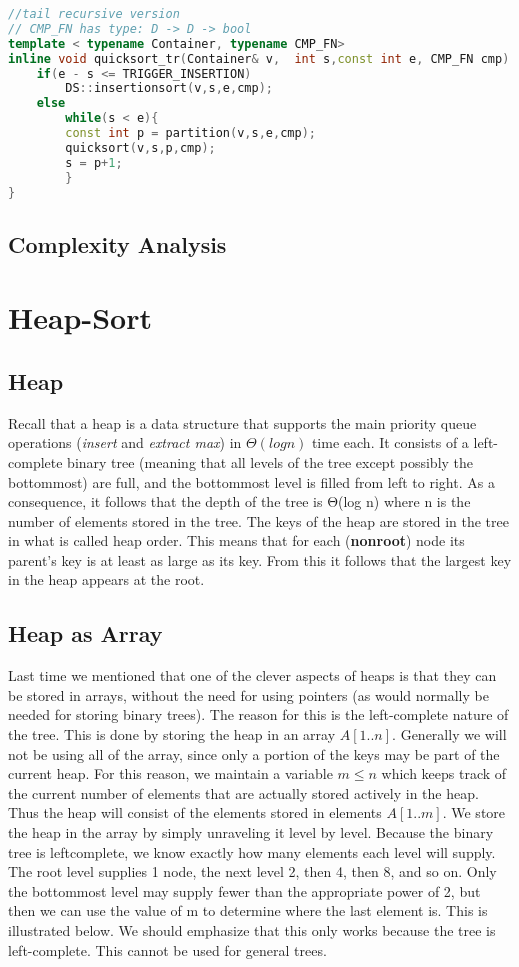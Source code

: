 \begin{lstlisting}[language=c++, caption="QuickSort Tail Recursive"]
//tail recursive version
// CMP_FN has type: D -> D -> bool
template < typename Container, typename CMP_FN>
inline void quicksort_tr(Container& v,  int s,const int e, CMP_FN cmp) {
    if(e - s <= TRIGGER_INSERTION)
        DS::insertionsort(v,s,e,cmp);
    else
        while(s < e){
        const int p = partition(v,s,e,cmp);
        quicksort(v,s,p,cmp);
        s = p+1;
        }
}
\end{lstlisting}


\subsection{Complexity Analysis}

\section{Heap-Sort}
\subsection{Heap}
Recall that a heap is a data structure that supports the main priority queue operations (\textit{insert} and \textit{extract max}) in $\mathcal{\Theta}(log n)$ time each. It consists of a left-complete binary tree (meaning that all levels of the tree except possibly the bottommost) are full, and the bottommost level is filled from left to right. As a consequence, it follows that the depth of the tree is Θ(log n) where n is the number of elements stored in the tree. The keys of the heap are stored in the tree in what is called heap order. This means that for each (\textbf{nonroot}) node its parent’s key is at least as large as its key. From this it follows that the largest key in the heap appears at the root.
\subsection{Heap as Array}
Last time we mentioned that one of the clever aspects of heaps is that they can be stored in
arrays, without the need for using pointers (as would normally be needed for storing binary trees). The
reason for this is the left-complete nature of the tree.
This is done by storing the heap in an array $A[1..n]$. Generally we will not be using all of the array,
since only a portion of the keys may be part of the current heap. For this reason, we maintain a variable
$m \leq n$ which keeps track of the current number of elements that are actually stored actively in the
heap. Thus the heap will consist of the elements stored in elements $A[1..m]$.
We store the heap in the array by simply unraveling it level by level. Because the binary tree is leftcomplete, we know exactly how many elements each level will supply. The root level supplies 1 node,
the next level 2, then 4, then 8, and so on. Only the bottommost level may supply fewer than the
appropriate power of 2, but then we can use the value of m to determine where the last element is. This
is illustrated below. We should emphasize that this only works because the tree is left-complete. This cannot be used for
general trees.

